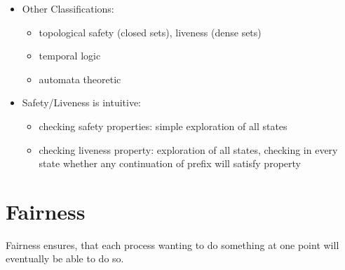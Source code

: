 \documentclass[a4paper, 10pt]{article}
\begin{document}
\begin{itemize}
\begin{itemize}
        \vspace*{-4em} {\tiny Note: for every finite property $\Phi: E(\Phi)=\Phi\cdot\Sigma^\omega$}
    \end{itemize}
    \item Other Classifications:
    \begin{itemize}
        \item topological \follows safety (closed sets), liveness (dense sets)
        \item temporal logic
        \item automata theoretic
    \end{itemize}
    \item Safety/Liveness is intuitive:
    \begin{itemize}
        \item checking safety properties: simple exploration of all states
        \item checking liveness property: exploration of all states, checking in every state whether any continuation of prefix will satisfy property
    \end{itemize}
\end{itemize}

\section*{Fairness}
Fairness ensures, that each process wanting to do something at one point will eventually be able to do so.
\end{document}
